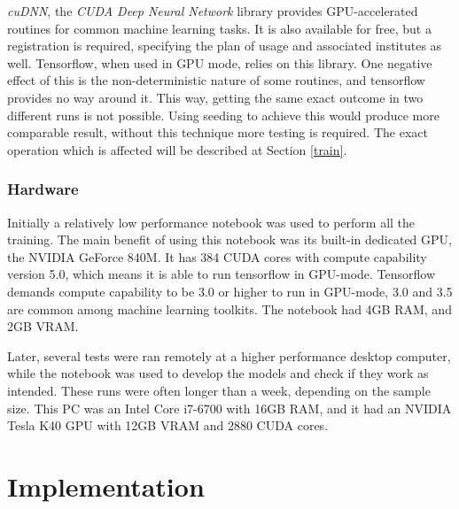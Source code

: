 \documentclass[12pt]{report}
\begin{document}
\label{cudnn}
\textit{cuDNN}, the \textit{CUDA Deep Neural Network} library provides GPU-accelerated routines for common machine learning tasks. It is also available for free, but a registration is required, specifying the plan of usage and associated institutes as well. Tensorflow, when used in GPU mode, relies on this library. One negative effect of this is the non-deterministic nature of some routines, and tensorflow provides no way around it. This way, getting the same exact outcome in two different runs is not possible. Using seeding to achieve this would produce more comparable result, without this technique more testing is required. The exact operation which is affected will be described at Section \ref{train}.
\subsection{Hardware}
Initially a relatively low performance notebook was used to perform all the training. The main benefit of using this notebook was its built-in dedicated GPU, the NVIDIA GeForce 840M. It has 384 CUDA cores with compute capability version 5.0, which means it is able to run tensorflow in GPU-mode. Tensorflow demands compute capability to be 3.0 or higher to run in GPU-mode, 3.0 and 3.5 are common among machine learning toolkits. The notebook had 4GB RAM, and 2GB VRAM.

Later, several tests were ran remotely at a higher performance desktop computer, while the notebook was used to develop the models and check if they work as intended. These runs were often longer than a week, depending on the sample size. This PC was an Intel Core i7-6700 with 16GB RAM, and it had an NVIDIA Tesla K40 GPU with 12GB VRAM and 2880 CUDA cores.
\chapter{Implementation}
\end{document}
